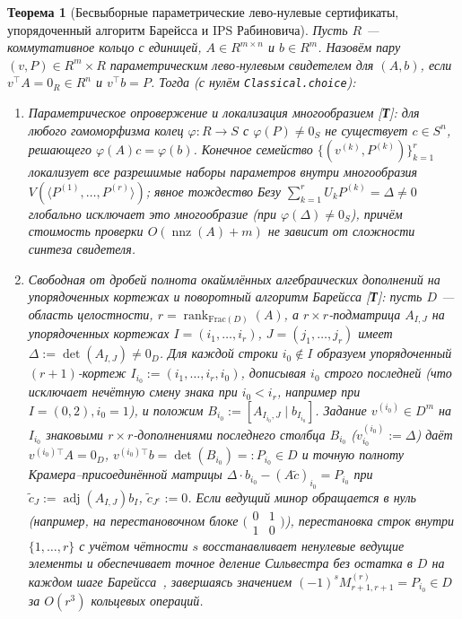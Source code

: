 \documentclass[11pt]{article}
\theoremstyle{plain}
\newtheorem{theorem}{Теорема}[section]
\theoremstyle{definition}
\begin{document}
\begin{theorem}[Бесвыборные параметрические лево-нулевые сертификаты, упорядоченный алгоритм Барейсса и $\mathrm{IPS}$ Рабиновича]\label{thm:left-null-bareiss-ips}
Пусть $R$ — коммутативное кольцо с единицей, $A \in R^{m \times n}$ и $b \in R^m$. Назовём пару $(v, P) \in R^m \times R$ \emph{параметрическим лево-нулевым свидетелем} для $(A, b)$, если $v^\top A = 0_R \in R^n$ и $v^\top b = P$. Тогда (с нулём \texttt{Classical.choice}):
\begin{enumerate}[nosep,label=(\roman*)]
\item \emph{Параметрическое опровержение и локализация многообразием \textup{[\textbf{Т}]}}: для любого гомоморфизма колец $\varphi : R \to S$ с $\varphi(P) \neq 0_S$ не существует $c \in S^n$, решающего $\varphi(A)c = \varphi(b)$. Конечное семейство $\{(v^{(k)}, P^{(k)})\}_{k=1}^r$ локализует все разрешимые наборы параметров внутри многообразия $V(\langle P^{(1)}, \dots, P^{(r)} \rangle)$; явное тождество Безу $\sum_{k=1}^r U_k P^{(k)} = \Delta \neq 0$ глобально исключает это многообразие (при $\varphi(\Delta) \neq 0_S$), причём стоимость проверки $O(\operatorname{nnz}(A) + m)$ не зависит от сложности синтеза свидетеля.
\item \emph{Свободная от дробей полнота окаймлённых алгебраических дополнений на упорядоченных кортежах и поворотный алгоритм Барейсса \textup{[\textbf{Т}]}}: пусть $D$ — область целостности, $r = \operatorname{rank}_{\mathrm{Frac}(D)}(A)$, а $r \times r$-подматрица $A_{I,J}$ на упорядоченных кортежах $I = (i_1, \dots, i_r)$, $J = (j_1, \dots, j_r)$ имеет $\Delta := \det(A_{I,J}) \neq 0_D$. Для каждой строки $i_0 \notin I$ образуем упорядоченный $(r+1)$-кортеж $I_{i_0} := (i_1, \dots, i_r, i_0)$, дописывая $i_0$ строго \emph{последней} (что исключает нечётную смену знака при $i_0 < i_r$, например при $I=(0,2), i_0=1$), и положим $B_{i_0} := [A_{I_{i_0}, J} \mid b_{I_{i_0}}]$. Задание $v^{(i_0)} \in D^m$ на $I_{i_0}$ знаковыми $r\times r$-дополнениями последнего столбца $B_{i_0}$ ($v^{(i_0)}_{i_0} := \Delta$) даёт $v^{(i_0)\top} A = 0_D$, $v^{(i_0)\top} b = \det(B_{i_0}) =: P_{i_0} \in D$ и точную полноту Крамера--присоединённой матрицы $\Delta \cdot b_{i_0} - (A\tilde{c})_{i_0} = P_{i_0}$ при $\tilde{c}_J := \operatorname{adj}(A_{I,J}) b_I$, $\tilde{c}_{J^c} := 0$. Если ведущий минор обращается в нуль (например, на перестановочном блоке $\bigl(\begin{smallmatrix} 0 & 1 \\ 1 & 0 \end{smallmatrix}\bigr)$), перестановка строк внутри $\{1,\dots,r\}$ с учётом чётности $s$ восстанавливает ненулевые ведущие элементы и обеспечивает точное деление Сильвестра без остатка в $D$ на каждом шаге Барейсса~\cite{Bareiss1968}, завершаясь значением $(-1)^s M^{(r)}_{r+1,r+1} = P_{i_0} \in D$ за $O(r^3)$ кольцевых операций.

\end{enumerate}
\end{theorem}
\end{document}
